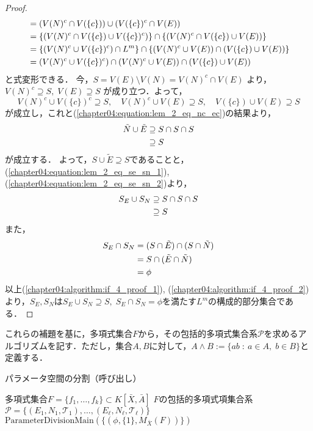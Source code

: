 \begin{proof}
\begin{align}
		&= (V(N)^c \cap V(\{ c \})) \cup (V(\{ c \})^c \cap V(E)) \notag \\
		&= \{ (V(N)^c \cap V(\{ c \}) \cup V(\{c\})^c) \} \cap \{ (V(N)^c \cap V(\{ c \}) \cup V(E)) \} \notag \\
		&= \{ (V(N)^c \cup V(\{c\})^c) \cap L^m\} \cap \{ (V(N)^c \cup V(E)) \cap (V(\{c\}) \cup V(E)) \} \notag \\
		&= (V(N)^c \cup V(\{c\})^c) \cap (V(N)^c \cup V(E)) \cap (V(\{c\}) \cup V(E)) \label{chapter04:equation:lem_2_eq_nc_ec}
	\end{align}
	と式変形できる．
	今，$S = V(E) \setminus V(N) = V(N)^c \cap V(E)$
	より，
	$V(N)^c \supseteq S, \; V(E) \supseteq S$
	が成り立つ．よって，
	$$V(N)^c \cup V(\{c\})^c \supseteq S, \quad V(N)^c \cup V(E) \supseteq S, \quad V(\{c\}) \cup V(E) \supseteq S$$
	が成立し，これと(\ref{chapter04:equation:lem_2_eq_nc_ec})の結果より，
	\begin{align}
		\tilde{N} \cup \tilde{E} &\supseteq S \cap S \cap S \notag\\
		&\supseteq S \label{chapter04:equation:lem_2_eq_se_sn_2}
	\end{align}
	が成立する．
	よって，$S \cup \tilde{E} \supseteq S$であることと，(\ref{chapter04:equation:lem_2_eq_se_sn_1}), (\ref{chapter04:equation:lem_2_eq_se_sn_2})より，
	\begin{align}
		S_E \cup S_N &\supseteq S \cap S \cap S \notag\\
		&\supseteq S \label{chapter04:algorithm:if_4_proof_1}
	\end{align}
	また，
	\begin{align}
		S_E \cap S_N &= (S \cap \tilde{E}) \cap (S \cap \tilde{N}) \notag \\
		&= S \cap (\tilde{E} \cap \tilde{N}) \notag \\
		&= \phi \label{chapter04:algorithm:if_4_proof_2}
	\end{align}
	以上(\ref{chapter04:algorithm:if_4_proof_1}), (\ref{chapter04:algorithm:if_4_proof_2})より，$S_E, S_N$は$S_E \cup S_N \supseteq S,\; S_E \cap S_N = \phi$を満たす$L^m$の構成的部分集合である．
\end{proof}

これらの補題を基に，多項式集合$F$から，その包括的多項式集合系$\mathcal{P}$を求めるアルゴリズムを記す．ただし，集合$A, B$に対して，$A \land B := \{ ab \; : \: a \in A, \; b \in B \}$と定義する．

\begin{algorithm}[htbp]
\caption{パラメータ空間の分割（呼び出し）}
\label{chapter04:algorithm:PD_alg_num}
\begin{algorithmic}[1]
\Require 多項式集合$F=\{ f_1, \dots, f_k \} \subset K[\bar{X}, \bar{A}]$
\Ensure $F$の包括的多項式項集合系$\mathcal{P}=\{ (E_1, N_1, \mathscr{T}_1), \dots, (E_\ell, N_\ell, \mathscr{T}_\ell) \}$
	\State \Return $ \mathrm{ParameterDivisionMain}(\{(\phi, \{ 1 \}, M_{\bar{X}}(F))\})$
\EndFunction
\end{algorithmic}
\end{algorithm}

